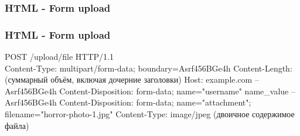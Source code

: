 \begin{frame}[fragile]
 	\frametitle{HTML - Form upload}
   
\end{frame}
\begin{frame}[fragile]
 	\frametitle{HTML - Form upload}
  \parbox{\textwidth}{
  \tiny
  POST /upload/file HTTP/1.1 \\
  Content-Type: multipart/form-data; boundary=Asrf456BGe4h\newline
  Content-Length: (суммарный объём, включая дочерние заголовки)\newline
  Host: example.com \newline
  \newline
  --Asrf456BGe4h\newline
  Content-Disposition: form-data; name="username"\newline
  \newline
  name\_value\newline
  --Asrf456BGe4h\newline
  Content-Disposition: form-data; name="attachment"; filename="horror-photo-1.jpg"\newline
  Content-Type: image/jpeg\newline
  \newline
  (двоичное содержимое файла)\newline
  }
\end{frame}
